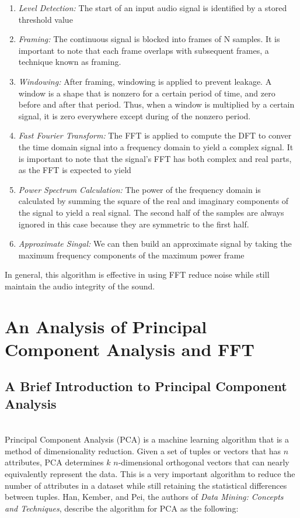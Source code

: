 \documentclass{amsproc}
\begin{document}
\begin{enumerate}

	\item \textit{Level Detection: }The start of an input audio signal is identified by a stored threshold value
	\item \textit{Framing: }The continuous signal is blocked into frames of N samples. It is important to note that each frame overlaps with subsequent frames,  a technique known as framing.
	\item \textit{Windowing: }After framing, windowing is applied to prevent leakage. A window is a shape that is nonzero for a certain period of time, and zero before and after that period. Thus, when a window is multiplied by a certain signal, it is zero everywhere except during of the nonzero period.
	\item \textit{Fast Fourier Transform: }The FFT is applied to compute the DFT to conver the time domain signal into a frequency domain to yield a complex signal. It is important to note that the signal's FFT has both complex and real parts, as the FFT is expected to yield
	\item \textit{Power Spectrum Calculation: }The power of the frequency domain is calculated by summing the square of the real and imaginary components of the signal to yield a real signal. The second half of the samples are always ignored in this case because they are symmetric to the first half.
	\item \textit{Approximate Singal: }We can then build an approximate signal by taking the maximum frequency components of the maximum power frame

\end{enumerate}

In general, this algorithm is effective in using FFT reduce noise while still maintain the audio integrity of the sound. 

\section{An Analysis of Principal Component Analysis and FFT}

\subsection{A Brief Introduction to Principal Component Analysis}

\mbox{}	 \\
\indent Principal Component Analysis (PCA) is a machine learning algorithm that is a method of dimensionality reduction. Given a set of tuples or vectors that has $n$ attributes, PCA determines $k$ $n$-dimensional orthogonal vectors that can nearly equivalently represent the data. This is a very important algorithm to reduce the number of attributes in a dataset while still retaining the statistical differences between tuples. Han, Kember, and Pei, the authors of \textit{Data Mining: Concepts and Techniques}, describe the algorithm for PCA as the following:
\end{document}

